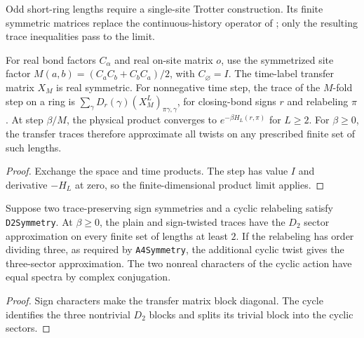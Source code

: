 Odd short-ring lengths require a single-site Trotter construction.
Its finite symmetric matrices replace the continuous-history operator of
\cite[Section 3]{OpenAIHaldane}; only the resulting trace inequalities pass to the limit.

\begin{lemma}
  \label{lem:single-site-transfer}
  \leanok
  For real bond factors \(C_\alpha\) and real on-site matrix \(o\), use the symmetrized site
  factor \(M(a,b)=(C_aC_b+C_bC_a)/2\), with \(C_{\varnothing}=I\).
  The time-label transfer matrix \(X_M\) is real symmetric.
  For nonnegative time step, the trace of the \(M\)-fold step on a ring is
  \(\sum_\gamma D_r(\gamma)(X_M^L)_{\pi\gamma,\gamma}\), for closing-bond signs \(r\) and
  relabeling \(\pi\).
  At step \(\beta/M\), the physical product converges to \(e^{-\beta H_L(r,\pi)}\) for
  \(L\ge2\). For \(\beta\ge0\), the transfer traces therefore approximate all twists on any
  prescribed finite set of such lengths.
\end{lemma}
\begin{proof}
  \leanok
  Exchange the space and time products. The step has value \(I\) and derivative \(-H_L\) at zero,
  so the finite-dimensional product limit applies.
\end{proof}

\begin{lemma}
  \label{lem:single-site-sectors}
  \leanok
  Suppose two trace-preserving sign symmetries and a cyclic relabeling satisfy
  \texttt{D2Symmetry}. At \(\beta\ge0\), the plain and sign-twisted traces have the \(D_2\)
  sector approximation on every finite set of lengths at least \(2\).
  If the relabeling has order dividing three, as required by \texttt{A4Symmetry}, the additional
  cyclic twist gives the three-sector approximation.
  The two nonreal characters of the cyclic action have equal spectra by complex conjugation.
\end{lemma}
\begin{proof}
  \leanok
  Sign characters make the transfer matrix block diagonal. The cycle identifies the three
  nontrivial \(D_2\) blocks and splits its trivial block into the cyclic sectors.
\end{proof}

